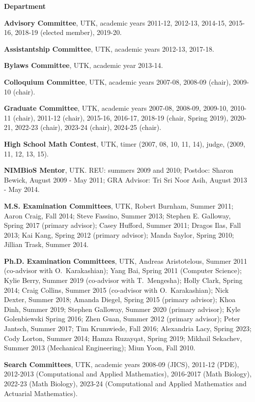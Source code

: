 \documentclass[11pt]{letter}
\begin{document}
\begin{description}
	\item
{\Large\bf Department}
    \begin{description}
    \item
\textbf{Advisory Committee}, UTK, academic years 2011-12, 2012-13, 2014-15, 2015-16, 2018-19 (elected member), 2019-20.
    \item
\textbf{Assistantship Committee}, UTK, academic years 2012-13, 2017-18.
    \item
\textbf{Bylaws Committee}, UTK, academic year 2013-14.
	\item
\textbf{Colloquium Committee}, UTK, academic years 2007-08, 2008-09 (chair), 2009-10 (chair).
    \item
\textbf{Graduate Committee}, UTK, academic years 2007-08, 2008-09, 2009-10, 2010-11 (chair), 2011-12 (chair), 2015-16, 2016-17, 2018-19 (chair, Spring 2019), 2020-21, 2022-23 (chair), 2023-24 (chair), 2024-25 (chair).
    \item
\textbf{High School Math Contest}, UTK, timer (2007, 08, 10, 11, 14), judge, (2009, 11, 12, 13, 15).
    \item
\textbf{NIMBioS Mentor}, UTK. REU: summers 2009 and 2010; Postdoc: Sharon Bewick, August 2009 - May 2011; GRA Advisor: Tri Sri Noor Asih, August 2013 - May 2014.
	\item
\textbf{M.S. Examination Committees}, UTK, Robert Burnham, Summer 2011; Aaron Craig, Fall 2014; Steve Fassino, Summer 2013; Stephen E. Galloway, Spring 2017 (primary advisor); Casey Hufford, Summer 2011; Dragos Ilas, Fall 2013; Kai Kang, Spring 2012 (primary advisor); Manda Saylor, Spring 2010; Jillian Trask, Summer 2014.
	\item
\textbf{Ph.D. Examination Committees}, UTK, Andreas Aristotelous, Summer 2011 (co-advisor with O.~Karakashian); Yang Bai, Spring 2011 (Computer Science); Kylie Berry, Summer 2019 (co-advisor with T.~Mengesha); Holly Clark,  Spring 2014; Craig Collins, Summer 2015 (co-advisor with O.~Karakashian); Nick Dexter, Summer 2018; Amanda Diegel, Spring 2015 (primary advisor); Khoa Dinh, Summer 2019; Stephen Galloway, Summer 2020 (primary advisor); Kyle Golenbiewski Spring 2016; Zhen Guan, Summer 2012 (primary advisor); Peter Jantsch, Summer 2017; Tim Krumwiede, Fall 2016; Alexandria Lacy, Spring 2023; Cody Lorton, Summer 2014; Hamza Ruzayqat, Spring 2019; Mikhail Sekachev, Summer 2013 (Mechanical Engineering); Miun Yoon, Fall 2010.
	\item
\textbf{Search Committees}, UTK, academic years 2008-09 (JICS), 2011-12 (PDE), 2012-2013 (Computational and Applied Mathematics), 2016-2017 (Math Biology), 2022-23 (Math Biology), 2023-24  (Computational and Applied Mathematics and Actuarial Mathematics).


\end{description}
\end{description}
\end{document}

